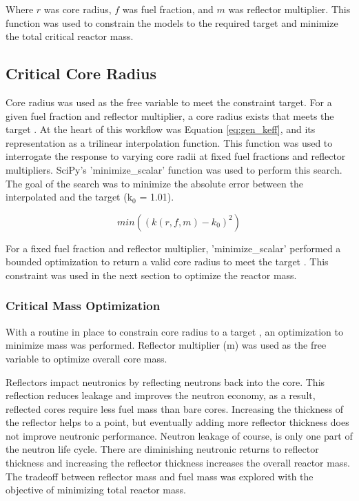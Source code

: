 Where $r$ was core radius, $f$ was fuel fraction, and $m$ was reflector multiplier. This
function was used to constrain the models to the required \keff target and
minimize the total critical reactor mass.


\subsection{Critical Core Radius}
Core radius was used as the free variable to meet the \keff constraint target. For
a given fuel fraction and reflector multiplier, a core radius exists that meets
the target \keff. At the heart of this workflow was Equation \ref{eq:gen_keff},
and its representation as a trilinear interpolation function. This function was
used to interrogate the \keff response to varying core radii at fixed fuel
fractions and reflector multipliers. SciPy's 'minimize\_scalar' function was used to
perform this search. The goal of the search was to minimize the absolute error
between the interpolated \keff and the target \keff (k$_0$ = 1.01).

\begin{equation}
    min( (k(r, f, m) - k_0)^2 )
    \label{eq:crit_rad}
\end{equation}

For a fixed fuel fraction and reflector multiplier, 'minimize\_scalar' performed a
bounded optimization to return a valid core radius to meet the target \keff.
This constraint was used in the next section to optimize the reactor mass.

\subsubsection{Critical Mass Optimization}
With a routine in place to constrain core radius to a target \keff, an
optimization to minimize mass was performed. Reflector multiplier (m) was used 
as the free variable to optimize overall core mass. 

Reflectors impact neutronics by reflecting neutrons back into the core. This
reflection reduces leakage and improves the neutron economy, as a result,
reflected cores require less fuel mass than bare cores. Increasing the
thickness of the reflector helps to a point, but eventually adding more reflector
thickness does not improve neutronic performance. Neutron leakage of course, is only
one part of the neutron life cycle. There are diminishing neutronic returns to
reflector thickness and increasing the reflector thickness increases the overall
reactor mass. The tradeoff between reflector mass and fuel mass was explored with 
the objective of minimizing total reactor mass. 

